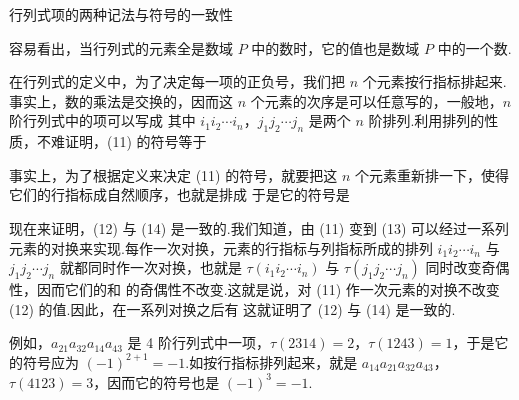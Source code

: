 

\begin{fdeep}{行列式项的两种记法与符号的一致性}

容易看出，当行列式的元素全是数域 $P$ 中的数时，它的值也是数域 $P$ 中的一个数.

在行列式的定义中，为了决定每一项的正负号，我们把 $n$ 个元素按行指标排起来.事实上，数的乘法是交换的，因而这 $n$ 个元素的次序是可以任意写的，一般地，$n$ 阶行列式中的项可以写成
其中 $i_1i_2\cdots i_n$，$j_1j_2\cdots j_n$ 是两个 $n$ 阶排列.利用排列的性质，不难证明，(11) 的符号等于

事实上，为了根据定义来决定 (11) 的符号，就要把这 $n$ 个元素重新排一下，使得它们的行指标成自然顺序，也就是排成
于是它的符号是

现在来证明，(12) 与 (14) 是一致的.我们知道，由 (11) 变到 (13) 可以经过一系列元素的对换来实现.每作一次对换，元素的行指标与列指标所成的排列 $i_1i_2\cdots i_n$ 与 $j_1j_2\cdots j_n$ 就都同时作一次对换，也就是 $\tau(i_1i_2\cdots i_n)$ 与 $\tau(j_1j_2\cdots j_n)$ 同时改变奇偶性，因而它们的和
的奇偶性不改变.这就是说，对 (11) 作一次元素的对换不改变 (12) 的值.因此，在一系列对换之后有
这就证明了 (12) 与 (14) 是一致的.

例如，$a_{21}a_{32}a_{14}a_{43}$ 是 4 阶行列式中一项，$\tau(2314)=2$，$\tau(1243)=1$，于是它的符号应为 $(-1)^{2+1}=-1$.如按行指标排列起来，就是 $a_{14}a_{21}a_{32}a_{43}$，$\tau(4123)=3$，因而它的符号也是 $(-1)^{3}=-1$.
\end{fdeep}


